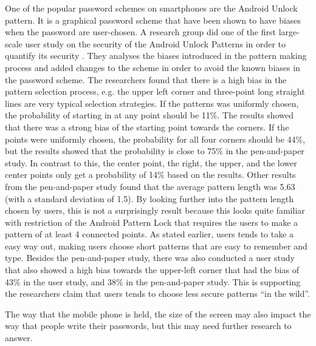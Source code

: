   One of the popular password schemes on smartphones are the Android Unlock pattern. It is a graphical password scheme that have been shown to have biases when the password are user-chosen. A research group did one of the first large-scale user study on the security of the Android Unlock Patterns in order to quantify its security \cite{Uellenbeck}. They analyses the biases introduced in the pattern making process and added changes to the scheme in order to avoid the known biases in the password scheme. The researchers found that there is a high bias in the pattern selection process, e.g. the upper left corner and three-point long straight lines are very typical selection strategies. If the patterns was uniformly chosen, the probability of starting in at any point should be 11\%. The results showed that there was a strong bias of the starting point towards the corners. If the points were uniformly chosen, the probability for all four corners should be 44\%, but the results showed that the probability is close to 75\% in the pen-and-paper study. In contrast to this, the center point, the right, the upper, and the lower center points only get a probability of 14\% based on the results. Other results from the pen-and-paper study found that the average pattern length was 5.63 (with a standard deviation of 1.5). By looking further into the pattern length chosen by users, this is not a surprisingly result because this looks quite familiar with restriction of the Android Pattern Lock that requires the users to make a pattern of at least 4 connected points. As stated earlier, users tends to take a easy way out, making users choose short patterns that are easy to remember and type. Besides the pen-and-paper study, there was also conducted a user study that also showed a high bias towards the upper-left corner that had the bias of 43\% in the user study, and 38\% in the pen-and-paper study. This is supporting the researchers claim that users tends to choose less secure patterns ``in the wild''. 

  The way that the mobile phone is held, the size of the screen may also impact the way that people write their passwords, but this may need further research to answer.

  
